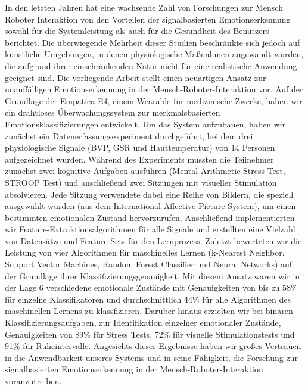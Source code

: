 

In den letzten Jahren hat eine wachsende Zahl von Forschungen zur Mensch Roboter Interaktion von den Vorteilen der signalbasierten Emotionserkennung sowohl für die Systemleistung als auch für die Gesundheit des Benutzers berichtet. Die überwiegende Mehrheit dieser Studien beschränkte sich jedoch auf künstliche Umgebungen, in denen physiologische Maßnahmen angewandt wurden, die aufgrund ihrer einschränkenden Natur nicht für eine realistische Anwendung geeignet sind.
Die vorliegende Arbeit stellt einen neuartigen Ansatz zur unauffälligen Emotionserkennung in der Mensch-Roboter-Interaktion vor. Auf der Grundlage der  Empatica E4, einem Wearable für medizinische Zwecke, haben wir ein drahtloses Überwachungssystem zur merkmalsbasierten Emotionsklassifizierungen entwickelt.
Um das System aufzubauen, haben wir zunächst ein Datenerfassungsexperiment durchgeführt, bei dem drei physiologische Signale (BVP, GSR und Hauttemperatur) von 14 Personen aufgezeichnet wurden. Während des Experiments mussten die Teilnehmer zunächst zwei kognitive Aufgaben ausführen (Mental Arithmetic Stress Test, STROOP Test) und anschließend zwei Sitzungen mit visueller Stimulation absolvieren. Jede Sitzung verwendete dabei eine Reihe von Bildern, die speziell ausgewählt wurden (aus dem International Affective Picture System), um einen bestimmten emotionalen Zustand hervorzurufen.
Anschließend implementierten wir Feature-Extraktionsalgorithmen für alle Signale und erstellten eine Vielzahl von Datensätze und Feature-Sets für den Lernprozess.
Zuletzt bewerteten wir die Leistung von vier Algorithmen für maschinelles Lernen (k-Nearest Neighbor, Support Vector Machines, Random Forest Classifier und Neural Networks) auf der Grundlage ihrer Klassifizierungsgenauigkeit.
Mit diesem Ansatz waren wir in der Lage 6 verschiedene emotionale Zustände mit Genauigkeiten von bis zu 58\% für einzelne Klassifikatoren und durchschnittlich 44\% für alle Algorithmen des maschinellen Lernens zu klassfizieren.
Darüber hinaus erzielten wir bei binären Klassifizierungsaufgaben, zur Identifikation einzelner emotionaler Zustände, Genauigkeiten von 89\% für Stress Tests, 72\% für visuelle Stimulationstests und 91\% für Ruheintervalle.
Angesichts dieser Ergebnisse haben wir großes Vertrauen in die Anwendbarkeit unseres Systems und in seine Fähigkeit, die Forschung zur signalbasierten Emotionserkennung in der Mensch-Roboter-Interaktion voranzutreiben.